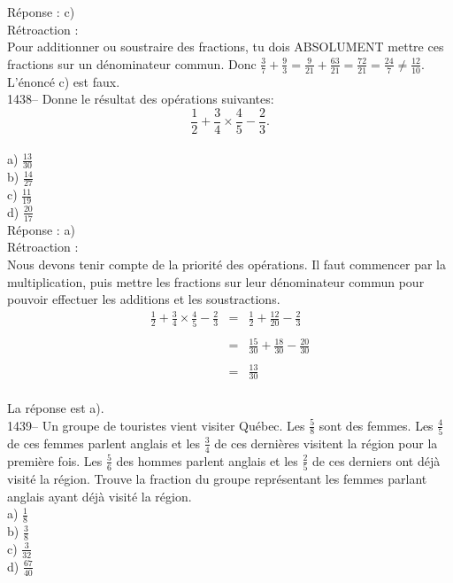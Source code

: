 R\'eponse : c)\\

R\'etroaction :\\
Pour additionner ou soustraire des fractions, tu dois ABSOLUMENT
mettre ces fractions sur un d\'enominateur commun. Donc
$\frac{3}{7}+\frac{9}{3}=\frac{9}{21}+\frac{63}{21}=\frac{72}{21}=\frac{24}{7}\neq\frac{12}{10}$.\\
L'\'enonc\'e c) est faux.\\

1438-- Donne le r\'esultat des op\'erations suivantes:\\
$$\frac{1}{2}+\frac{3}{4}\times\frac{4}{5}-\frac{2}{3}.$$\\[3mm]
a) $\frac{13}{30}$\\[3mm]
b) $\frac{14}{27}$\\[3mm]
c) $\frac{11}{19}$\\[3mm]
d) $\frac{20}{17}$\\[3mm]

R\'eponse : a)\\

R\'etroaction :\\
Nous devons tenir compte de la priorit\'e des op\'erations. Il faut
commencer par la multiplication, puis mettre les fractions sur leur
d\'enominateur commun pour pouvoir effectuer les additions et les
soustractions.\\
\begin{eqnarray*}
\frac{1}{2}+\frac{3}{4}\times\frac{4}{5}-\frac{2}{3}&=&\frac{1}{2}+\frac{12}{20}-\frac{2}{3}\\\\
&=&\frac{15}{30}+\frac{18}{30}-\frac{20}{30}\\\\
&=&\frac{13}{30}
\end{eqnarray*}\\
La r\'eponse est a).\\

1439-- Un groupe de touristes vient visiter Qu\'ebec. Les
$\frac{5}{8}$ sont des femmes. Les $\frac{4}{5}$ de ces femmes
parlent anglais et les $\frac{3}{4}$ de ces derni\`eres visitent la
r\'egion pour la premi\`ere fois. Les $\frac{5}{6}$ des hommes
parlent anglais et les $\frac{2}{5}$ de ces derniers ont d\'ej\`a
visit\'e la r\'egion. Trouve la fraction du groupe repr\'esentant
les femmes parlant anglais ayant
d\'ej\`a visit\'e la r\'egion.\\[3mm]
a) $\frac{1}{8}$\\[3mm]
b) $\frac{3}{8}$\\[3mm]
c) $\frac{3}{32}$\\[3mm]
d) $\frac{67}{40}$\\[3mm]

